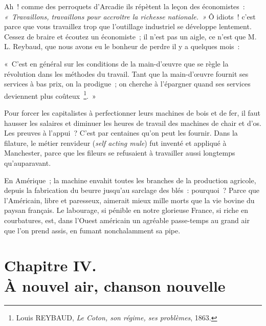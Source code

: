 \documentclass[french,twoside]{book} %
\newenvironment{quoteblock}%
  {\begin{quoting}}
  {\end{quoting}}
\newcommand\chapteropen{} %
\newcommand\chapterclose{} %
\newenvironment{quotebar}{%
    \def\FrameCommand{{\color{rubric!10!}\vrule width 0.5em} \hspace{0.9em}}%
    \def\OuterFrameSep{\itemsep} %
    \MakeFramed {\advance\hsize-\width \FrameRestore}
  }%
  {%
    \endMakeFramed
  }
\renewenvironment{quoteblock}%
  {%
    \savenotes
    \setstretch{0.9}
    \normalfont
    \begin{quotebar}
  }
  {%
    \end{quotebar}
    \spewnotes
  }
\begin{document}
Ah ! comme des perroquets d’Arcadie ils répètent la leçon des économistes : \emph{« Travaillons, travaillons pour accroître la richesse nationale. »} Ô idiots ! c’est parce que vous travaillez trop que l’outillage industriel se développe lentement. Cessez de braire et écoutez un économiste ; il n’est pas un aigle, ce n’est que M. L. Reybaud, que nous avons eu le bonheur de perdre il y a quelques mois :\par

\begin{quoteblock}
 \noindent « C’est en général sur les conditions de la main-d’œuvre que se règle la révolution dans les méthodes du travail. Tant que la main-d’œuvre fournit ses services à bas prix, on la prodigue ; on cherche à l’épargner quand ses services deviennent plus coûteux \footnote{Louis REYBAUD, \emph{Le Coton, son régime, ses problèmes}, 1863.}. »
\end{quoteblock}

\noindent Pour forcer les capitalistes à perfectionner leurs machines de bois et de fer, il faut hausser les salaires et diminuer les heures de travail des machines de chair et d’os. Les preuves à l’appui ? C’est par centaines qu’on peut les fournir. Dans la filature, le métier renvideur (\emph{self acting mule}) fut inventé et appliqué à Manchester, parce que les fileurs se refusaient à travailler aussi longtemps qu’auparavant.\par
En Amérique ; la machine envahit toutes les branches de la production agricole, depuis la fabrication du beurre jusqu’au sarclage des blés : pourquoi ? Parce que l’Américain, libre et paresseux, aimerait mieux mille morts que la vie bovine du paysan français. Le labourage, si pénible en notre glorieuse France, si riche en courbatures, est, dans l’Ouest américain un agréable passe-temps au grand air que l’on prend assis, en fumant nonchalamment sa pipe.
\chapterclose


\chapteropen
\chapter[Chapitre IV. À nouvel air, chanson nouvelle]{Chapitre IV. \\
À nouvel air, chanson nouvelle}\renewcommand{\leftmark}{Chapitre IV. \\
À nouvel air, chanson nouvelle}
\end{document}
